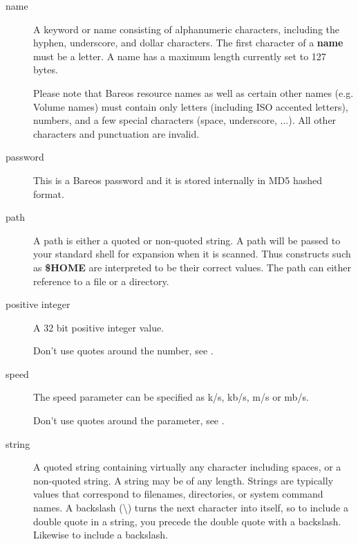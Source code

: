 \begin{description}
\item [name]
    \label{DataTypeName}
   A keyword or name consisting of alphanumeric characters, including the
hyphen, underscore, and dollar  characters. The first character of a {\bf
name} must be  a letter.  A name has a maximum length currently set to 127
bytes.

Please note that Bareos resource names as well as certain other
names (e.g. Volume names) must contain only letters (including ISO accented
letters), numbers, and a few special characters (space, underscore, ...).
All other characters and punctuation are invalid.


\item [password]
    \label{DataTypePassword}
   This is a Bareos password and it is stored internally in MD5 hashed format.



\item [path]
    \label{DataTypeDirectory}
   A path is either a quoted or  non-quoted string. A path will be
passed to your  standard shell for expansion when it is scanned. Thus
constructs such as {\bf \$HOME} are interpreted to be  their correct values.
The path can either reference to a file or a directory.


\item [positive integer]
    \label{DataTypePositiveInteger}
   A 32 bit positive integer value.

   Don't use quotes around the number, see .


\item [speed]
    \label{DataTypeSpeed}
    The speed parameter can be specified as k/s, kb/s, m/s or mb/s.

    Don't use quotes around the parameter, see .


\item [string]
    \label{DataTypeString}
   A quoted string containing virtually any  character including spaces, or a
non-quoted string. A  string may be of any length. Strings are typically
values  that correspond to filenames, directories, or system  command names. A
backslash (\textbackslash{}) turns the next character into  itself, so to
include a double quote in a string, you precede the  double quote with a
backslash. Likewise to include a backslash.



\end{description}
